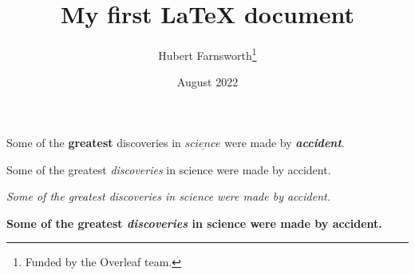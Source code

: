 \documentclass[12pt, letterpaper]{article}
\title{My first LaTeX document}
\author{Hubert Farnsworth\thanks{Funded by the Overleaf team.}}
\date{August 2022}
\begin{document}
	\maketitle
	
	Some of the \textbf{greatest} discoveries in $\underline{science}$ were made by \textbf{\textit{accident}}.

	Some of the greatest \emph{discoveries} in science were made by accident.

	\textit{Some of the greatest \emph{discoveries} in science were made by accident.}

	\textbf{Some of the greatest \emph{discoveries} in science were made by accident.}
\end{document}
